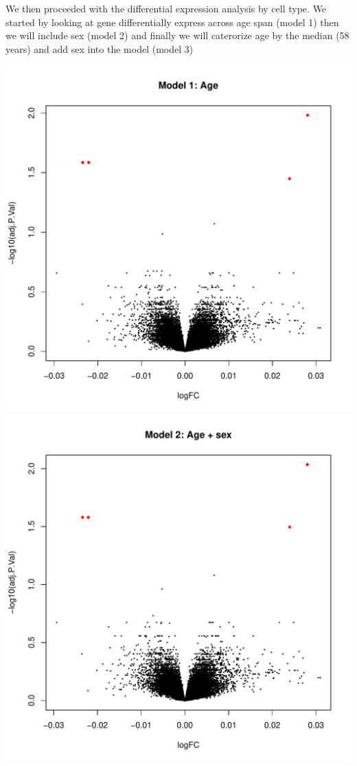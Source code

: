 \documentclass[]{article}
\begin{document}
We then proceeded with the differential expression analysis by cell
type. We started by looking at gene differentially express across age
span (model 1) then we will include sex (model 2) and finally we will
caterorize age by the median (58 years) and add sex into the model
(model 3)

\includegraphics{./Vplot.mod1.pdf} \includegraphics{./Vplot.mod2.pdf}
\end{document}
